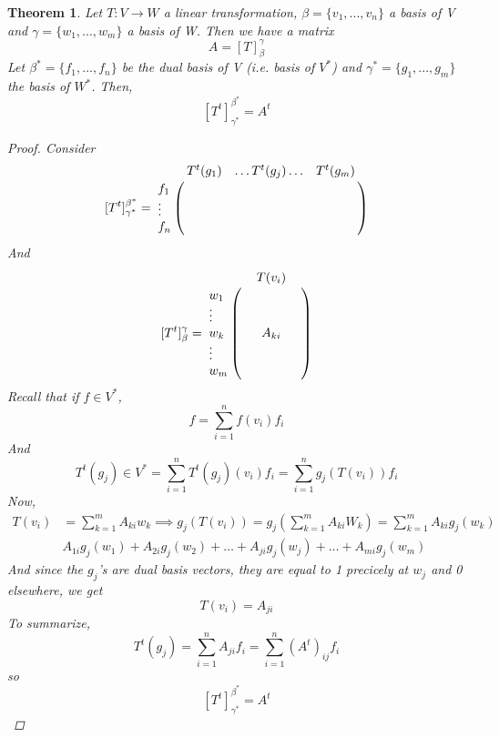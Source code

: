 \documentclass[12pt]{article}
\newtheorem{theorem}{Theorem}[section]
\theoremstyle{definition}
\theoremstyle{remark}
\begin{document}
        \begin{theorem}
            Let $T:V \rightarrow W$ a linear transformation, $\beta =\{v_1, ...,v_n \}$ a basis of V and $\gamma = \{ w_1, ..., w_m\}$ a basis of W.
            Then we have a matrix 
            $$A = [T]^\gamma_\beta$$
            Let $\beta^* =\{f_1, ...,f_n \}$  be the dual basis of V (i.e. basis of $V^*$) and $\gamma^* = \{ g_1, ..., g_m\}$ the basis of $W^*$.
            Then, 
            $$[T^t]^{\beta^*}_{\gamma^*} = A^t$$ 
            \begin{proof}
            Consider $$[T^t]^{\beta^*}_{\gamma^*} = 
\bordermatrix{~ & T^t(g_1)&\hdots T^t(g_j)\hdots &T^t(g_m)\cr
              f_1  & & &\cr
               \vdots & & & \cr
              f_n  & &  & \cr}$$
            And 
            $$[T^t]^{\gamma}_{\beta} = 
\bordermatrix{~ & &T(v_i )&\cr
              w_1  & & &\cr
               \vdots & & & \cr
               w_k & &A_{ki} & \cr
               \vdots & & & \cr
              w_m  & &  & \cr}$$ 
            Recall that if $f\in V^*$, $$f = \sum^n_{i=1} f(v_i) f_i$$
            And $$T^t (g_j) \in V^* = \sum^n_{i=1} T^t(g_j)(v_i)f_i = \sum^n_{i=1} g_j(T(v_i))f_i$$
            Now, 
            \begin{align*}
                T(v_i) &= \sum^m_{k=1} A_{ki}w_k \implies g_j(T(v_i)) = g_j(\sum^m_{k=1} A_{ki} W_k) = \sum^m_{k=1} A_{ki}g_j(w_k)\\
                       &A_{1i} g_j(w_1) + A_{2i}g_j(w_2) + \hdots + A_{ji}g_j(w_j) + \hdots + A_{mi} g_j (w_m)
            \end{align*}
            And since the $g_j$'s are dual basis vectors, they are equal to 1 precicely at $w_j$ and 0 elsewhere, we get
            $$T(v_i) = A_{ji}$$
            To summarize, 
            $$T^t(g_j) = \sum^n_{i=1} A_{ji} f_i = \sum^n_{i=1}(A^t)_{ij} f_i$$
            so $$[T^t]^{\beta^*}_{\gamma^*} = A^t$$
            \end{proof}

        \end{theorem}
\end{document}
